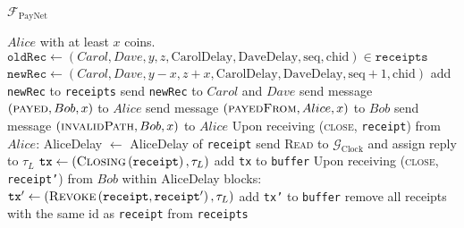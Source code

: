 \begin{functionality}{$\mathcal{F}_{\mathrm{PayNet}}$}
\begin{algorithmic}[1]
      $Alice$ with at least $x$ coins.
          \State $\mathtt{oldRec} \gets \left(Carol, Dave, y, z,
          \mathrm{CarolDelay}, \mathrm{DaveDelay}, \mathrm{seq},
          \mathrm{chid}\right) \in \mathtt{receipts}$
          \State $\mathtt{newRec} \gets \left(Carol, Dave, y - x, z + x,
          \mathrm{CarolDelay}, \mathrm{DaveDelay}, \mathrm{seq} + 1,
          \mathrm{chid}\right)$
          \State add \texttt{newRec} to \texttt{receipts}
          \State send \texttt{newRec} to $Carol$ and $Dave$
        \EndFor
        \State send message $\left(\textsc{payed}, Bob, x\right)$ to $Alice$
        \State send message $\left(\textsc{payedFrom}, Alice, x\right)$ to $Bob$
      \Else
        \State send message $\left(\textsc{invalidPath}, Bob, x\right)$ to
        $Alice$
      \EndIf
    \EndIndent
    \State
    \State Upon receiving (\textsc{close}, \texttt{receipt}) from $Alice$:
    \Indent
        \State AliceDelay $\gets$ AliceDelay of \texttt{receipt}
        \State send \textsc{Read} to $\mathcal{G}_{\mathrm{Clock}}$ and assign
        reply to $\tau_L$
        \State $\mathtt{tx} \gets
        \left(\textsc{Closing}\left(\mathtt{receipt}\right), \tau_L\right)$
        \State add \texttt{tx} to \texttt{buffer}
        \State Upon receiving (\textsc{close}, \texttt{receipt'}) from $Bob$
        within AliceDelay blocks:
          \State $\mathtt{tx'} \gets
          \left(\textsc{Revoke}\left(\mathtt{receipt}, \mathtt{receipt'}\right),
          \tau_L\right)$
          \State add \texttt{tx'} to \texttt{buffer} 
        \EndIf
        \State remove all receipts with the same id as \texttt{receipt} from
        \texttt{receipts}
      \EndIf
    \EndIndent
  \end{algorithmic}
\end{functionality}
